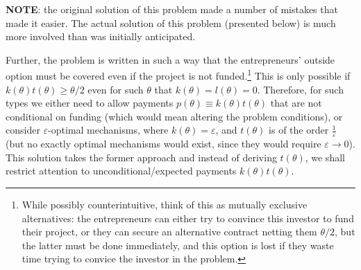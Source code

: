 \documentclass[a4paper]{article}
\begin{document}
	\textbf{NOTE}: the original solution of this problem made a number of mistakes that made it easier. The actual solution of this problem (presented below) is much more involved than was initially anticipated.
	
	Further, the problem is written in such a way that the entrepreneurs' outside option must be covered even if the project is not funded.\footnote{While possibly counterintuitive, think of this as mutually exclusive alternatives: the entrepreneurs can either try to convince this investor to fund their project, or they can secure an alternative contract netting them $\theta/2$, but the latter must be done immediately, and this option is lost if they waste time trying to convice the investor in the problem.}
	This is only possible if $k(\theta)t(\theta) \geq \theta/2$ even for such $\theta$ that $k(\theta)=l(\theta)=0$. Therefore, for such types we either need to allow payments $p(\theta) \equiv k(\theta)t(\theta)$ that are not conditional on funding (which would mean altering the problem conditions), or consider $\varepsilon$-optimal mechanisms, where $k(\theta) = \varepsilon$, and $t(\theta)$ is of the order $\frac{1}{\varepsilon}$ (but no exactly optimal mechanisms would exist, since they would require $\varepsilon \to 0$). This solution takes the former approach and instead of deriving $t(\theta)$, we shall restrict attention to unconditional/expected payments $k(\theta)t(\theta)$.
	
\end{document}

